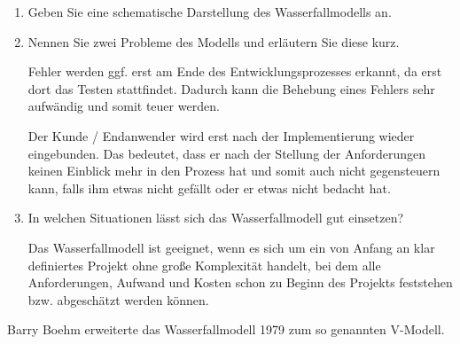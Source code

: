\documentclass{bschlangaul-aufgabe}
\begin{document}
\begin{enumerate}


\item Geben Sie eine schematische Darstellung des
Wasserfallmodells an.

\begin{bAntwort}
\end{bAntwort}


\item Nennen Sie zwei Probleme des Modells und erläutern Sie diese kurz.

\begin{bAntwort}
Fehler werden ggf. erst am Ende des Entwicklungsprozesses erkannt, da
erst dort das Testen stattfindet. Dadurch kann die Behebung eines
Fehlers sehr aufwändig und somit teuer werden.

Der Kunde / Endanwender wird erst nach der Implementierung wieder
eingebunden. Das bedeutet, dass er nach der Stellung der Anforderungen
keinen Einblick mehr in den Prozess hat und somit auch nicht
gegensteuern kann, falls ihm etwas nicht gefällt oder er etwas nicht
bedacht hat.
\end{bAntwort}


\item In welchen Situationen lässt sich das Wasserfallmodell gut
einsetzen?

\begin{bAntwort}
Das Wasserfallmodell ist geeignet, wenn es sich um ein von Anfang an
klar definiertes Projekt ohne große Komplexität handelt, bei dem alle
Anforderungen, Aufwand und Kosten schon zu Beginn des Projekts
feststehen bzw. abgeschätzt werden können.
\end{bAntwort}

\end{enumerate}

\noindent
Barry Boehm erweiterte das Wasserfallmodell 1979 zum so genannten
V-Modell.
\end{document}

